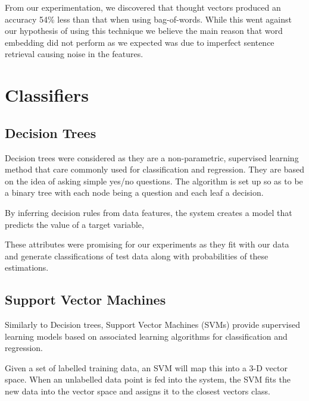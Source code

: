 \documentclass[bsc,frontabs,twoside,singlespacing,parskip,deptreport]{infthesis}     %
\begin{document}


From our experimentation, we discovered that thought vectors produced an accuracy 54\% less than that when
using bag-of-words. While this went against our hypothesis of using this technique we believe
the main reason that word embedding did not perform as we expected was due to imperfect sentence retrieval causing noise in
the features.

\section{Classifiers}\label{sec:classifiers}
\subsection{Decision Trees}
Decision trees were considered as they are a non-parametric, supervised learning method that care commonly used for
classification and regression.
They are based on the idea of asking simple yes/no questions. The algorithm is set up so as to be a binary tree with
each node being a question and each leaf a decision.

By inferring decision rules from data features, the system creates a model that predicts the value of a target variable,

These attributes were promising for our experiments as they fit with our data and generate
classifications of test data along with probabilities of these estimations.


\subsection{Support Vector Machines}
Similarly to Decision trees, Support Vector Machines (SVMs) provide supervised learning models based on
associated learning algorithms for classification and regression.

Given a set of labelled training data, an SVM will map this into a 3-D vector space.
When an unlabelled data point is fed into the system, the SVM fits the new data into the vector space and
assigns  it to the closest vectors class.
\end{document}

